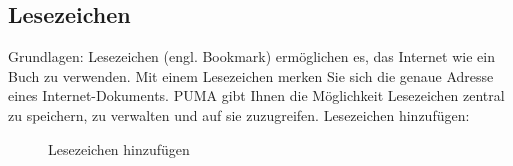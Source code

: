 \subsection{Lesezeichen} %
Grundlagen:
\newline
Lesezeichen (engl. Bookmark) ermöglichen es, das Internet wie ein Buch zu verwenden. Mit einem Lesezeichen merken Sie sich die genaue Adresse eines Internet-Dokuments. PUMA gibt Ihnen die Möglichkeit Lesezeichen zentral zu speichern, zu verwalten und auf sie zuzugreifen. 
\newline
\newline
Lesezeichen hinzufügen: 
\begin{figure}[h!]
 \centering
 \caption{Lesezeichen hinzufügen}
 \label{figure3}
\end{figure} 
